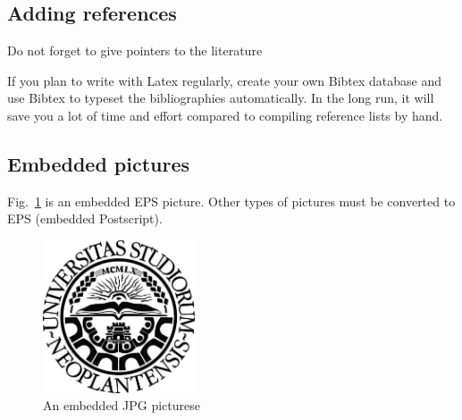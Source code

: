 \documentclass[a4paper,12pt]{article}
\begin{document}


\subsection{Adding references}\label{sec:references}

Do not forget to give pointers to the literature \cite{opengl_kronos}

If you plan to write with Latex regularly, create your own Bibtex
database and use Bibtex to typeset the bibliographies automatically.
In the long run, it will save you a lot of time and effort compared to
compiling reference lists by hand.




\subsection{Embedded pictures}\label{sec:pictures}

Fig.~\ref{fig:mypicture1} is an embedded EPS picture. Other types of pictures must be converted to EPS (embedded Postscript).

\begin{figure}[t]
  \begin{center}
    \includegraphics[width=0.4\textwidth,height=0.4\textheight,keepaspectratio]{NoviSadLogoGray.jpg}
    \caption{An embedded JPG picturese }
    \label{fig:mypicture1}
  \end{center}
\end{figure}



\clearpage

 
%
% 
%
%
\end{document}
